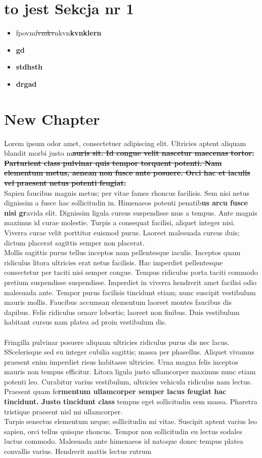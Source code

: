 \documentclass{article}
\begin{document}
\section{\textnormal{\textbf{to jest Sekcja nr 1}}}
\begin{itemize}\item fpovmf\sout{vmkv}nkvn\textbf{kvnklern}\item \textbf{gd}\item \textbf{stdhsth}\item \textbf{drgad}\end{itemize}
\section{\textnormal{New \textbf{Chapter}}}
Lorem ipsum odor amet, consectetuer adipiscing elit. Ultricies aptent aliquam blandit morbi justo m\textbf{\sout{auris sit. Id congue velit nascetur maecenas tortor. Parturient class pulvinar quis tempor torquent potenti. Nam elementum metus, aenean non fusce ante posuere. Orci hac et iaculis vel praesent netus potenti feugiat.}}\\Sapien faucibus magnis metus; per vitae fames rhoncus facilisis. Sem nisi netus dignissim a fusce hac sollicitudin in. Himenaeos potenti penatib\textbf{us arcu fusce nisi gr}avida elit. Dignissim ligula cursus suspendisse mus a tempus. Ante magnis maximus id curae molestie. Turpis a consequat facilisi, aliquet integer nisi. Viverra curae velit porttitor euismod purus. Laoreet malesuada cursus duis; dictum placerat sagittis semper non placerat.\\Mollis sagittis purus tellus inceptos nam pellentesque iaculis. Inceptos quam ridiculus litora ultricies erat netus facilisis. Hac imperdiet pellentesque consectetur per taciti nisi semper congue. Tempus ridiculus porta taciti commodo pretium suspendisse suspendisse. Imperdiet in viverra hendrerit amet facilisi odio malesuada ante. Tempor purus facilisis tincidunt etiam; nunc suscipit vestibulum mauris mollis. Faucibus accumsan elementum laoreet montes faucibus dis dapibus. Felis ridiculus ornare lobortis; laoreet non finibus. Duis vestibulum habitant cursus nam platea ad proin vestibulum dis.\\\\Fringilla pulvinar posuere aliquam ultricies ridiculus purus dis nec lacus. SScelerisque sed eu integer cubilia sagittis; massa per phasellus. Aliquet vivamus praesent enim imperdiet risus habitasse ultricies. Urna magna felis inceptos mauris non tempus efficitur. Litora ligula justo ullamcorper maximus nunc etiam potenti leo. Curabitur varius vestibulum, ultricies vehicula ridiculus nam lectus. Praesent quam fe\textbf{rmentum ullamcorper semper lacus feugiat hac tincidunt. Justo tincidunt class} tempus eget sollicitudin sem massa. Pharetra tristique praesent nisl mi ullamcorper.\\Turpis senectus elementum neque; sollicitudin mi vitae. Suscipit aptent varius leo sapien, orci tellus quisque rhoncus. Tempor non sollicitudin eu lectus sodales luctus commodo. Malesuada ante himenaeos id natoque donec tempus platea convallis varius. Hendrerit mattis lectus rutrum 
\end{document}
